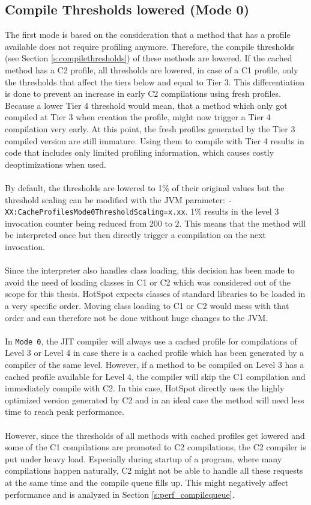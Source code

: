 \subsection{Compile Thresholds lowered (Mode 0)}
\label{s:mode0}
The first mode is based on the consideration that a method that has a profile available does not require profiling anymore. Therefore, the compile thresholds (see Section \ref{s:compilethresholds}) of these methods are lowered. If the cached method has a C2 profile, all thresholds are lowered, in case of a C1 profile, only the thresholds that affect the tiers below and equal to Tier 3. This differentiation is done to prevent an increase in early C2 compilations using fresh profiles. Because a lower Tier 4 threshold would mean, that a method which only got compiled at Tier 3 when creation the profile, might now trigger a Tier 4 compilation very early. At this point, the fresh profiles generated by the Tier 3 compiled version are still immature. Using them to compile with Tier 4 results in code that includes only limited profiling information, which causes costly deoptimizations when used. 
\\\\
By default, the thresholds are lowered to 1\% of their original values but the threshold scaling can be modified with the JVM parameter: \texttt{-XX:CacheProfilesMode0ThresholdScaling=x.xx}. 1\% results in the level 3 invocation counter being reduced from 200 to 2. This means that the method will be interpreted once but then directly trigger a compilation on the next invocation.
\\\\
Since the interpreter also handles class loading, this decision has been made to avoid the need of loading classes in C1 or C2 which was considered out of the scope for this thesis. HotSpot expects classes of standard libraries to be loaded in a very specific order. Moving class loading to C1 or C2 would mess with that order and can therefore not be done without huge changes to the JVM.
\\\\
In \texttt{Mode 0}, the JIT compiler will always use a cached profile for compilations of Level 3 or Level 4 in case there is a cached profile which has been generated by a compiler of the same level. However, if a method to be compiled on Level 3 has a cached profile available for Level 4, the compiler will skip the C1 compilation and immediately compile with C2. In this case, HotSpot directly uses the highly optimized version generated by C2 and in an ideal case the method will need less time to reach peak performance.
\\\\
However, since the thresholds of all methods with cached profiles get lowered and some of the C1 compilations are promoted to C2 compilations, the C2 compiler is put under heavy load. Especially during startup of a program, where many compilations happen naturally, C2 might not be able to handle all these requests at the same time and the compile queue fills up. This might negatively affect performance and is analyzed in Section \ref{s:perf_compilequeue}.

